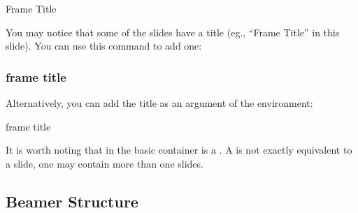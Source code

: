 \begin{fragileframe}{Frame Title}

You may notice that some of the slides have a title (eg., ``Frame Title'' in this slide). You can use this command to add one:

\begin{command}
\begin{LCL}
\begin{frame}
  \frametitle{frame title}
\end{frame}
\end{LCL}
\end{command}

Alternatively, you can add the title as an argument of the  environment:

\begin{command}
\begin{LCL}
\begin{frame}{frame title}
  
\end{frame}
\end{LCL}
\end{command}

It is worth noting that in  the basic container is a . A  is not exactly equivalent to a slide, one  may contain more than one slides.

\end{fragileframe}


\subsection{Beamer Structure}


